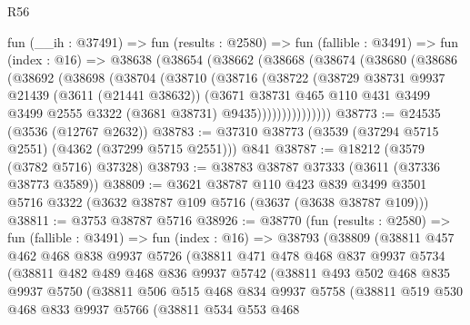 \begin{lexlean}{R56}
\begin{coremodule}
    fun (__ih : @37491) =>
    fun (results : @2580) =>
    fun (fallible : @3491) =>
    fun (index : @16) =>
    @38638
      (@38654
        (@38662
          (@38668
            (@38674
              (@38680
                (@38686
                  (@38692
                    (@38698
                      (@38704
                        (@38710
                          (@38716
                            (@38722
                              (@38729
                                @38731
                                @9937
                                @21439
                                (@3611 (@21441 @38632))
                                (@3671
                                  @38731
                                  @465
                                  @110
                                  @431
                                  @3499
                                  @3499
                                  @2555
                                  @3322
                                  (@3681 @38731)
                                  @9435)))))))))))))))
@38773 := @24535 (@3536 (@12767 @2632))
@38783 := @37310 @38773 (@3539 (@37294 @5715 @2551) (@4362 (@37299 @5715 @2551))) @841
@38787 := @18212 (@3579 (@3782 @5716) @37328)
@38793 := @38783 @38787 @37333 (@3611 (@37336 @38773 @3589))
@38809 := @3621
    @38787
    @110
    @423
    @839
    @3499
    @3501
    @5716
    @3322
    (@3632 @38787 @109 @5716 (@3637 (@3638 @38787 @109)))
@38811 := @3753 @38787 @5716
@38926 := @38770
    (fun (results : @2580) =>
    fun (fallible : @3491) =>
    fun (index : @16) =>
    @38793
      (@38809
        (@38811
          @457
          @462
          @468
          @838
          @9937
          @5726
          (@38811
            @471
            @478
            @468
            @837
            @9937
            @5734
            (@38811
              @482
              @489
              @468
              @836
              @9937
              @5742
              (@38811
                @493
                @502
                @468
                @835
                @9937
                @5750
                (@38811
                  @506
                  @515
                  @468
                  @834
                  @9937
                  @5758
                  (@38811
                    @519
                    @530
                    @468
                    @833
                    @9937
                    @5766
                    (@38811
                      @534
                      @553
                      @468

\end{coremodule}
\end{lexlean}
